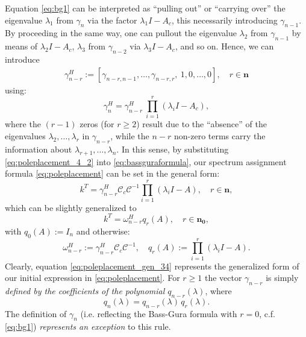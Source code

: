 \documentclass[conference]{IEEEtran}
\newcommand{\numn}{\boldsymbol{n}}
\newcommand{\numno}{\boldsymbol{n_0}}
\begin{document}
Equation \eqref{eq:bg1} can be interpreted as ``pulling out'' or ``carrying over'' the eigenvalue $\lambda_1$ from $\gamma_{n}$ via the factor $\lambda_1 I -A_c$, this necessarily introducing $\gamma_{n-1}$. By proceeding in the same way, one can pullout the eigenvalue $\lambda_2$ from $\gamma_{n-1}$ by means of $\lambda_2I-A_c$, $\lambda_3$ from $\gamma_{n-2}$ via $\lambda_3I-A_c$, and so on. Hence, we can introduce
\begin{align}\label{eq:gammar}
\gamma^H_{n-r}:=[\gamma_{n-r,n-1},\ldots, \gamma_{n-r,r},~1,0,\ldots,0], \quad r\in \numn
\end{align}
using: \begin{equation}
\label{eq:poleplacement_4_2}
\gamma_{n}^H =\gamma_{n-r}^H~ \prod_{i=1}^{r} (\lambda_iI-A_c),
\end{equation}
where the $(r-1)$ zeros (for $r\geq 2$) result due to the ``absence''
of the eigenvalues $\lambda_2,\ldots,\lambda_r$ in $\gamma_{n-r}$,
while the $n-r$ non-zero terms carry the information about $\lambda_{r+1},\ldots,\lambda_n$.
In this sense, by substituting \eqref{eq:poleplacement_4_2} into  \eqref{eq:bassguraformula}, our spectrum assignment formula \eqref{eq:poleplacement} can be set in the general form:
\begin{equation}
\label{eq:poleplacement_gen}
k^T = \gamma_{n-r}^H \mathcal{C}_c \mathcal{C}^{-1} \prod_{i=1}^{r} (\lambda_iI-A), \quad r\in \numn,
\end{equation}
which can be slightly generalized to
\begin{equation}
\label{eq:poleplacement_gen_34}
k^T = \omega_{n-r}^H q_r(A), \quad r\in \numno,
\end{equation}
with $q_0(A):=I_n$ and otherwise:
\begin{equation}
\omega_{n-r}^H := \gamma_{n-r}^H \mathcal{C}_c \mathcal{C}^{-1},\quad q_r(A) := \prod_{i=1}^{r} (\lambda_i I -A).
\label{canocical char pol_2_234}
\end{equation}
Clearly, equation \eqref{eq:poleplacement_gen_34} represents the generalized form of our initial expression in \eqref{eq:poleplacement}. For $r \geq 1$ the vector $\gamma_{n-r}$ is simply \emph{defined by the coefficients of the polynomial $q_{n-r}(\lambda)$}, where
\begin{equation}
q_n(\lambda) = q_{n-r}(\lambda)\, q_r(\lambda).
\label{qlambda}
\end{equation}
The definition of $\gamma_{n}$ (i.e. reflecting the Bass-Gura formula with $r=0$, c.f. \eqref{eq:bg1}) \emph{represents an exception} to this rule.
\end{document}
